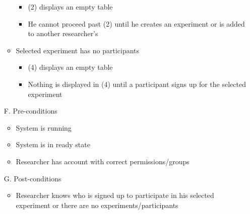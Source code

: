 \documentclass{article}
\begin{document}
\begin{enumerate}
\begin{itemize}
        \begin{itemize}
        \item (2) displays an empty table
        \item He cannot proceed past (2) until he creates an experiment or is added to another researcher's
        \end{itemize}
    \item Selected experiment has no participants
        \begin{itemize}
        \item (4) displays an empty table
        \item Nothing is displayed in (4) until a participant signs up for the selected experiment
        \end{itemize}
    \end{itemize}
\item[F.] Pre-conditions
    \begin{itemize}
    \item System is running
    \item System is in ready state
    \item Researcher has account with correct permissions/groups
    \end{itemize}
\item[G.] Post-conditions
    \begin{itemize}
    \item Researcher knows who is signed up to participate in his selected experiment or there are no experiments/participants
    \end{itemize}
\end{enumerate}
\end{document}
